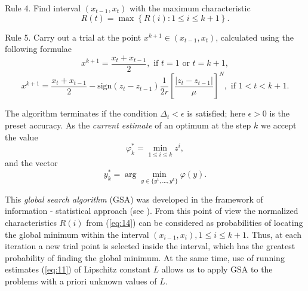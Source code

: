 \documentclass{llncs}
\begin{document}
Rule 4. Find interval $(x_{t-1},x_t)$ with the maximum characteristic
\begin{equation}\label{eq:141}
R(t)=\max{\left\{R(i): 1 \leq i \leq k+1\right\}}.
\end{equation}

Rule 5. Carry out a trial at the point $x^{k+1}\in(x_{t-1},x_t)$, calculated using the following formulae
\[
x^{k+1} = \frac{x_t+x_{t-1}}{2}, \textrm{ if } t=1 \textrm{ or } t=k+1,
\]
\begin{equation}\label{eq:142}
x^{k+1} = \frac{x_t+x_{t-1}}{2} - \mathrm{sign}(z_t-z_{t-1})\frac{1}{2r}\left[\frac{\left|z_t-z_{t-1}\right|}{\mu}\right]^N, \textrm{ if } 1<t<k+1.
\end{equation}

The algorithm terminates if the condition $\Delta_t<\epsilon$ is satisfied; here $\epsilon>0$ is the preset accuracy. As the \textit{current estimate} of an optimum at the step $k$ we accept the value 
\begin{equation}\label{eq:phistar}
\varphi_k^\ast=\min_{1\leq i \leq k}z^i,
\end{equation}
and the vector 
\[
y_k^\ast=\arg \min_{y \in \{ y^1,...,y^k\} }\varphi(y).
\]

This \textit{global search algorithm} (GSA) was developed in the framework of information - statistical approach (see \cite{Strongin2000}). From this point of view the normalized characteristics $R(i)$ from (\ref{eq:14}) can be considered as probabilities of locating the global minimum within the interval  $(x_{i-1},x_i), 1\leq i \leq k+1$. Thus, at each iteration a new trial point is selected inside the interval, which has the greatest probability of finding the global minimum.
At the same time, use of running estimates (\ref{eq:11}) of Lipschitz constant $L$ allows us to apply GSA to the problems with a priori unknown values of $L$. 
\end{document}
